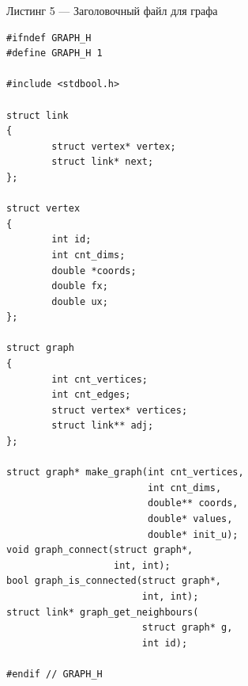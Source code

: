 \documentclass[a4paper,12pt]{article}
\begin{document}
\vspace{1em}
Листинг 5 --- Заголовочный файл для графа
\normalsize
\begin{verbatim}
#ifndef GRAPH_H
#define GRAPH_H 1

#include <stdbool.h>

struct link
{
        struct vertex* vertex;
        struct link* next;
};

struct vertex
{
        int id;
        int cnt_dims;
        double *coords;
        double fx;
        double ux;
};

struct graph
{
        int cnt_vertices;
        int cnt_edges;
        struct vertex* vertices;
        struct link** adj;
};

struct graph* make_graph(int cnt_vertices, 
                         int cnt_dims,
                         double** coords, 
                         double* values,
                         double* init_u);
void graph_connect(struct graph*, 
                   int, int);
bool graph_is_connected(struct graph*, 
                        int, int);
struct link* graph_get_neighbours(
                        struct graph* g, 
                        int id);

#endif // GRAPH_H

\end{verbatim}
\large
\end{document}
